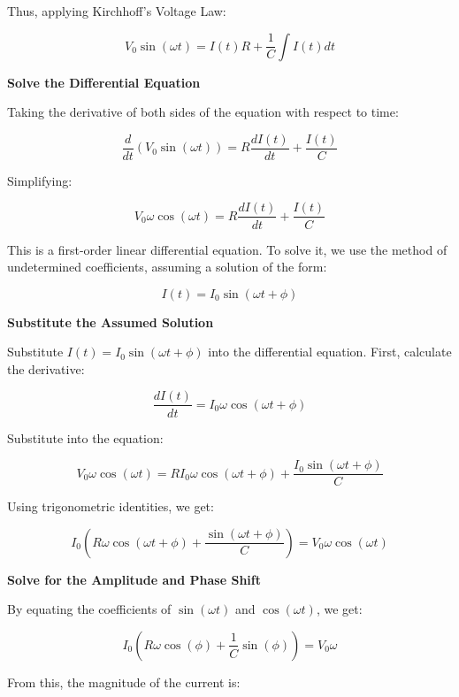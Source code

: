 \documentclass{beamer}
\begin{document}
\begin{frame}

Thus, applying Kirchhoff’s Voltage Law:

\[
V_0 \sin(\omega t) = I(t) R + \frac{1}{C} \int I(t) dt
\]

\textbf{Solve the Differential Equation}

Taking the derivative of both sides of the equation with respect to time:

\[
\frac{d}{dt} \left( V_0 \sin(\omega t) \right) = R \frac{dI(t)}{dt} + \frac{I(t)}{C}
\]

Simplifying:

\[
V_0 \omega \cos(\omega t) = R \frac{dI(t)}{dt} + \frac{I(t)}{C}
\]

This is a first-order linear differential equation. To solve it, we use the method of undetermined coefficients, assuming a solution of the form:

\[
I(t) = I_0 \sin(\omega t + \phi)
\]

\textbf{Substitute the Assumed Solution}

\end{frame}

\begin{frame}

Substitute \( I(t) = I_0 \sin(\omega t + \phi) \) into the differential equation. First, calculate the derivative:

\[
\frac{dI(t)}{dt} = I_0 \omega \cos(\omega t + \phi)
\]

Substitute into the equation:

\[
V_0 \omega \cos(\omega t) = R I_0 \omega \cos(\omega t + \phi) + \frac{I_0 \sin(\omega t + \phi)}{C}
\]

Using trigonometric identities, we get:

\[
I_0 \left( R \omega \cos(\omega t + \phi) + \frac{\sin(\omega t + \phi)}{C} \right) = V_0 \omega \cos(\omega t)
\]

\textbf{Solve for the Amplitude and Phase Shift}

By equating the coefficients of \( \sin(\omega t) \) and \( \cos(\omega t) \), we get:

\[
I_0 \left( R \omega \cos(\phi) + \frac{1}{C} \sin(\phi) \right) = V_0 \omega
\]

From this, the magnitude of the current is:


\end{frame}
\end{document}
